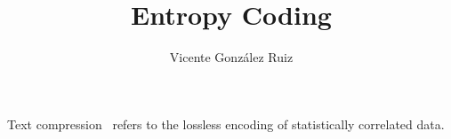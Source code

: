 \title{Entropy Coding}
\author{Vicente González Ruiz}
\maketitle

Text compression~\cite{mahoney2012data, wikibooks2018data,
  moffat2002compression, wiegand2011source, blelloch2001introduction,
  salomon2004data} refers to the lossless encoding of statistically
correlated data.

\section{}
\section{}
\section{}


